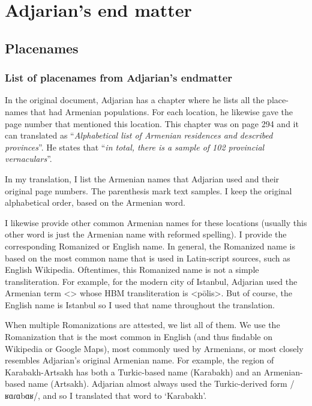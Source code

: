 \part{Adjarian's end matter}
\chapter{Placenames     }



\section{List of placenames from Adjarian's endmatter}
In the original document, Adjarian has a chapter where he lists all the place-names that had Armenian populations. For each location, he likewise gave the page number that mentioned this location.  This chapter was on page   294 and it can translated as ``\textit{Alphabetical list of Armenian residences and described provinces}''. He states that ``\textit{in total, there is a sample of 102 provincial vernaculars}''. 

In my translation, I list the Armenian names that Adjarian used and their original page numbers. The parenthesis mark text samples. I keep the original alphabetical order, based on the Armenian word.

I likewise provide other common Armenian names for these locations (usually this other word is just the Armenian name with reformed spelling). I provide  the corresponding Romanized or English name. In general, the Romanized name is based on the most common name that is used in Latin-script sources, such as English Wikipedia. Oftentimes, this Romanized name is not a simple transliteration. For example, for the modern city of Istanbul, Adjarian used the Armenian term  <> whose HBM transliteration is <pōlis>. But of course, the English name is Istanbul so I used that name throughout the translation. 

When multiple Romanizations are attested, we list all of them. We use the Romanization that is the most common in English (and thus findable on Wikipedia or Google Maps), most commonly used by Armenians, or most closely resembles Adjarian's original Armenian name. For example, the region of Karabakh-Artsakh has both a Turkic-based name (Karabakh) and an Armenian-based name (Artsakh). Adjarian almost always used the Turkic-derived form  /ʁɑɾɑbɑʁ/, and so I translated that word to `Karabakh'. 


